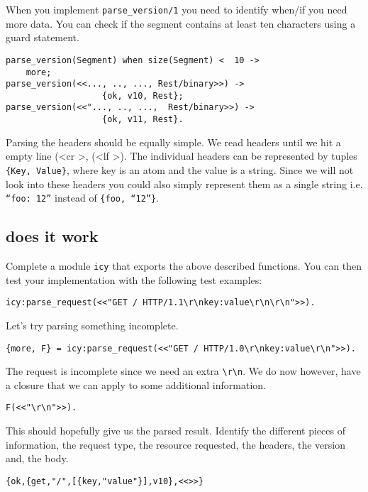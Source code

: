 \documentclass[a4paper,dvips,11pt]{article}
\begin{document}
When you implement {\tt parse\_version/1} you need to identify
when/if you need more data. You can check if the segment contains at
least ten characters using a guard statement. 

\begin{verbatim}
parse_version(Segment) when size(Segment) <  10 ->
    more;
parse_version(<<..., .., ..., Rest/binary>>) ->
                   {ok, v10, Rest};
parse_version(<<"..., .., ...,  Rest/binary>>) ->
                   {ok, v11, Rest}.
\end{verbatim}

Parsing the headers should be equally simple. We read headers until we
hit a empty line (\textless cr \textgreater, (\textless lf
\textgreater). The individual headers can be represented by tuples
            {\tt \{Key, Value\}}, where key is an atom and the value
            is a string.  Since we will not look into these headers
            you could also simply represent them as a single string
            i.e. {\tt ``foo: 12''} instead of {\tt\{foo, ``12''\}}.

\subsection{does it work}

Complete a module {\tt icy} that exports the above described
functions. You can then test your implementation with the following test examples:

\begin{verbatim}
icy:parse_request(<<"GET / HTTP/1.1\r\nkey:value\r\n\r\n">>).
\end{verbatim}

Let's try parsing something incomplete.

\begin{verbatim}
{more, F} = icy:parse_request(<<"GET / HTTP/1.0\r\nkey:value\r\n">>).
\end{verbatim}
The request is incomplete since we need an extra \verb+\r\n+. We do now
however, have a closure that we can apply to some additional information.

\begin{verbatim}
F(<<"\r\n">>).
\end{verbatim}

This should hopefully give us the parsed result. Identify the
different pieces of information, the request type, the resource
requested, the headers, the version and, the body.

\begin{verbatim}
{ok,{get,"/",[{key,"value"}],v10},<<>>}
\end{verbatim}
\end{document}
